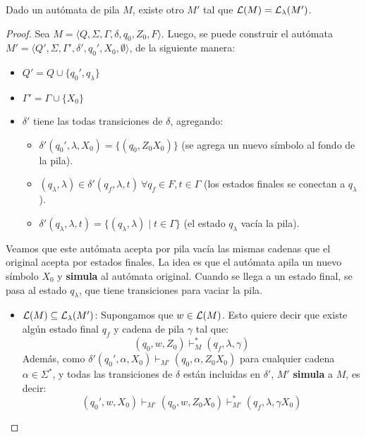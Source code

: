 \begin{theorem*}
    Dado un autómata de pila $M$, existe otro $M'$ tal que $\mathcal{L}(M) = \mathcal{L}_\lambda(M')$.
\end{theorem*}
\begin{proof}
    Sea $M = \langle Q, \Sigma, \Gamma, \delta, q_0, Z_0, F \rangle$. Luego, se puede construir el autómata $M' = \langle Q', \Sigma, \Gamma', \delta', q_0', X_0, \emptyset \rangle$, de la siguiente manera:
    \begin{itemize}
        \item $Q' = Q \cup \{q_0', q_\lambda\}$
        \item $\Gamma' = \Gamma \cup \{X_0\}$
        \item $\delta'$ tiene las todas transiciones de $\delta$, agregando:
        \begin{itemize}
            \item $\delta'(q_0', \lambda, X_0) = \{(q_0, Z_0 X_0)\}$ (se agrega un nuevo símbolo al fondo de la pila).
            \item $(q_\lambda, \lambda) \in \delta'(q_f, \lambda, t) \ \forall q_f \in F, t \in \Gamma$ (los estados finales se conectan a $q_\lambda$).
            \item $\delta'(q_\lambda, \lambda, t) = \{(q_\lambda, \lambda) \mid t \in \Gamma\}$ (el estado $q_\lambda$ vacía la pila).
        \end{itemize}
    \end{itemize}

    Veamos que este autómata acepta por pila vacía las mismas cadenas que el original acepta por estados finales. La idea es que el autómata apila un nuevo símbolo $X_0$ y \textbf{simula} al autómata original. Cuando se llega a un estado final, se pasa al estado $q_\lambda$, que tiene transiciones para vaciar la pila.

    \begin{itemize}
        \item $\mathcal{L}(M) \subseteq \mathcal{L}_\lambda(M')$: Supongamos que $w \in \mathcal{L}(M)$. Esto quiere decir que existe algún estado final $q_f$ y cadena de pila $\gamma$ tal que:
        $$
            (q_0, w, Z_0) \vdash_M^* (q_f, \lambda, \gamma)
        $$
        Además, como $\delta'(q_0', \alpha, X_0) \vdash_{M'} (q_0, \alpha, Z_0 X_0)$ para cualquier cadena $\alpha \in \Sigma^*$, y todas las transiciones de $\delta$ están incluidas en $\delta'$, $M'$ \textbf{simula} a $M$, es decir:
        $$
            (q_0', w, X_0) \vdash_{M'} (q_0, w, Z_0 X_0) \vdash_{M'}^* (q_f, \lambda, \gamma X_0)
        $$


\end{itemize}
\end{proof}
